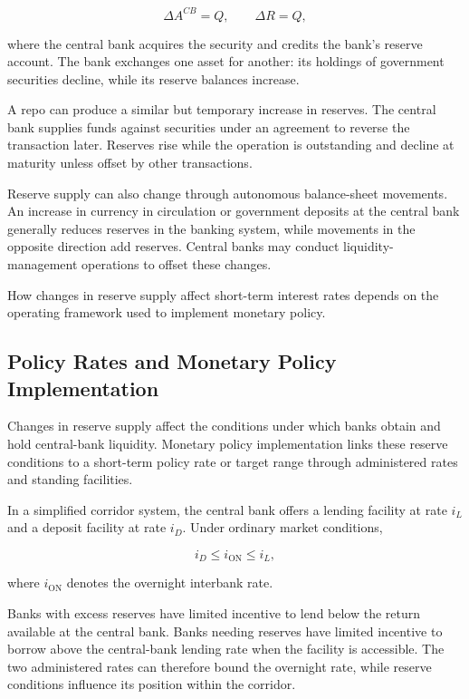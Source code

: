 \begin{equation}
\Delta A^{CB}=Q,
\qquad
\Delta R=Q,
\label{eq:ch22-asset-purchase-reserves}
\end{equation}

where the central bank acquires the security and credits the bank's reserve account. The bank exchanges one asset for another: its holdings of government securities decline, while its reserve balances increase.

A repo can produce a similar but temporary increase in reserves. The central bank supplies funds against securities under an agreement to reverse the transaction later. Reserves rise while the operation is outstanding and decline at maturity unless offset by other transactions.

Reserve supply can also change through autonomous balance-sheet movements. An increase in currency in circulation or government deposits at the central bank generally reduces reserves in the banking system, while movements in the opposite direction add reserves. Central banks may conduct liquidity-management operations to offset these changes.

How changes in reserve supply affect short-term interest rates depends on the operating framework used to implement monetary policy.


\subsection{Policy Rates and Monetary Policy Implementation}

Changes in reserve supply affect the conditions under which banks obtain and hold central-bank liquidity. Monetary policy implementation links these reserve conditions to a short-term policy rate or target range through administered rates and standing facilities.

In a simplified corridor system, the central bank offers a lending facility at rate \(i_L\) and a deposit facility at rate \(i_D\). Under ordinary market conditions,

\begin{equation}
i_D
\leq
i_{\mathrm{ON}}
\leq
i_L,
\label{eq:ch22-corridor}
\end{equation}

where \(i_{\mathrm{ON}}\) denotes the overnight interbank rate.

Banks with excess reserves have limited incentive to lend below the return available at the central bank. Banks needing reserves have limited incentive to borrow above the central-bank lending rate when the facility is accessible. The two administered rates can therefore bound the overnight rate, while reserve conditions influence its position within the corridor.

